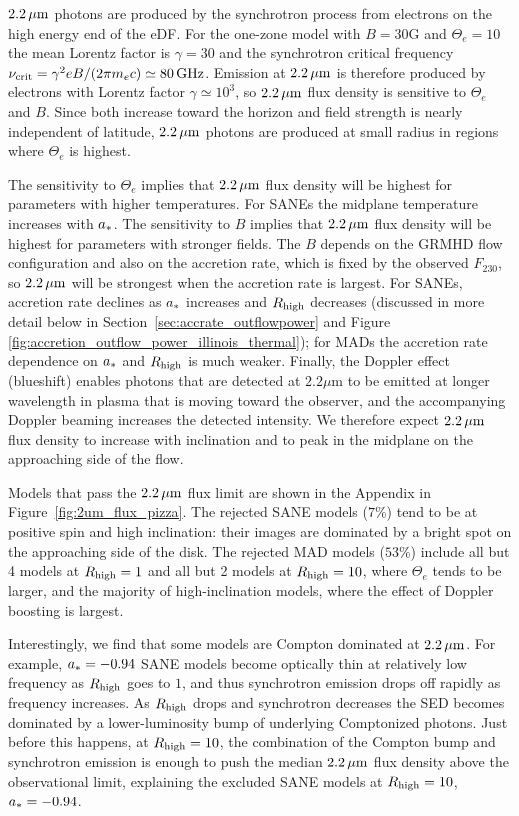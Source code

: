 
$2.2\,\mu\mathrm{m}$ photons are produced by the synchrotron process from electrons on the high energy end of the eDF.  For the one-zone model with $B = 30$G and $\Theta_e = 10$ the mean Lorentz factor is $\gamma = 30$ and the synchrotron critical frequency $\nu_\mathrm{crit} = \gamma^2 e B/(2 \pi m_e c) \simeq 80\,\mathrm{GHz}$.  Emission at $2.2\,\mu\mathrm{m}$ is therefore produced by electrons with  Lorentz factor $\gamma \simeq 10^3$, so $2.2\,\mu\mathrm{m}$ flux density is sensitive to $\Theta_e$ and $B$.  Since both increase toward the horizon and field strength is nearly independent of latitude, $2.2\,\mu\mathrm{m}$ photons are produced at small radius in regions where $\Theta_e$ is highest.

The sensitivity to $\Theta_e$ implies that $2.2\,\mu\mathrm{m}$ flux density will be highest for parameters with higher temperatures.  For SANEs the midplane temperature increases with $a_*$.
The sensitivity to $B$ implies that $2.2\,\mu\mathrm{m}$ flux density will be highest for parameters with stronger fields.  The $B$ depends on the GRMHD flow configuration and also on the accretion rate, which is fixed by the observed $F_{230}$, so $2.2\,\mu\mathrm{m}$ will be strongest when the accretion rate is largest.  For SANEs, accretion rate declines as $a_*$ increases and $R_\mathrm{high}$ decreases (discussed in more detail below in  Section~\ref{sec:accrate_outflowpower} and Figure \ref{fig:accretion_outflow_power_illinois_thermal}); for MADs the accretion rate dependence on $a_*$ and $R_\mathrm{high}$ is much weaker.
Finally, the Doppler effect (blueshift) enables photons that are detected at $2.2\mu$m to be emitted at longer wavelength in plasma that is moving toward the observer, and the accompanying Doppler beaming increases the detected intensity.  We therefore expect $2.2\,\mu\mathrm{m}$ flux density to increase with inclination and to peak in the midplane on the approaching side of the flow.

Models that pass the $2.2\,\mu\mathrm{m}$ flux limit are shown in the Appendix in Figure~\ref{fig:2um_flux_pizza}. The rejected SANE models ($7\%$) tend to be at positive spin and high inclination: their images are dominated by a bright spot on the approaching side of the disk.
The rejected MAD models ($53\%$) include all but 4 models at $R_\mathrm{high} = 1$ and all but 2 models at $R_\mathrm{high} = 10$, where $\Theta_e$ tends to be larger, and the majority of high-inclination models, where the effect of Doppler boosting is largest.

Interestingly, we find that some models are Compton dominated at $2.2\,\mu\mathrm{m}$.  For example, $a_* = -0.94$ SANE models become optically thin at relatively low frequency as $R_\mathrm{high}$ goes to $1$, and thus synchrotron emission drops off rapidly as frequency increases.
As $R_\mathrm{high}$ drops and synchrotron decreases the SED becomes dominated by a lower-luminosity bump of underlying Comptonized photons.  Just before this happens, at $R_\mathrm{high} = 10$, the combination of the Compton bump and synchrotron emission is enough to push the median $2.2\,\mu\mathrm{m}$ flux density above the observational limit, explaining the excluded SANE models at $R_\mathrm{high} = 10$, $a_* = -0.94$.


